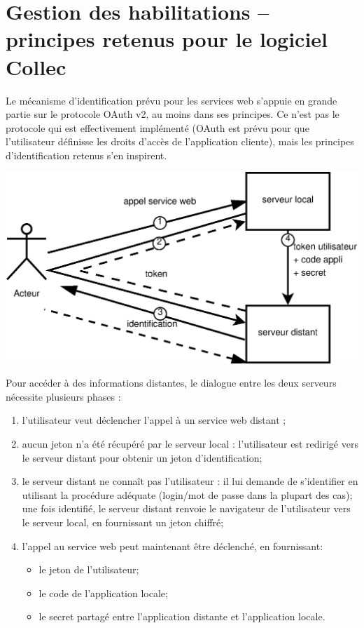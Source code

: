 \chapter{Gestion des habilitations -- principes retenus pour le logiciel Collec}
\label{oauth}

Le mécanisme d'identification prévu pour les services web s'appuie en grande partie sur le protocole OAuth v2, au moins dans ses principes. Ce n'est pas le protocole qui est effectivement implémenté (OAuth est prévu pour que l'utilisateur définisse les droits d'accès de l'application cliente), mais les principes d'identification retenus s'en inspirent.

\includegraphics[width=\linewidth]{images/appel_sw_identification}

Pour accéder à des informations distantes, le dialogue entre les deux serveurs nécessite plusieurs phases :
\begin{enumerate}
\item l'utilisateur veut déclencher l'appel à un service web distant ;
\item aucun jeton n'a été récupéré par le serveur local : l'utilisateur est redirigé vers le serveur distant pour obtenir un jeton d'identification;
\item le serveur distant ne connaît pas l'utilisateur : il lui demande de s'identifier en utilisant la procédure adéquate (login/mot de passe dans la plupart des cas);
\\une fois identifié, le serveur distant renvoie le navigateur de l'utilisateur vers le serveur local, en fournissant un jeton chiffré;
\item l'appel au service web peut maintenant être déclenché, en fournissant:
\begin{itemize}
\item le jeton de l'utilisateur;
\item le code de l'application locale;
\item le secret partagé entre l'application distante et l'application locale.
\end{itemize}
\end{enumerate}



